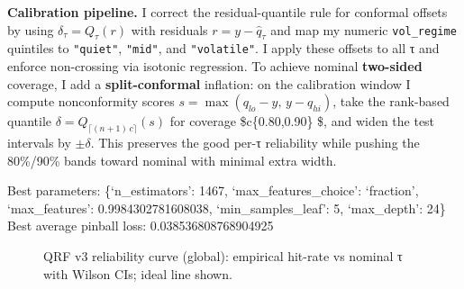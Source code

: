 \documentclass[
  a4paper,
  DIV=11,
  numbers=noendperiod]{scrreprt}
\begin{document}
\textbf{Calibration pipeline.} I correct the residual-quantile rule for
conformal offsets by using \(\delta_\tau = Q_\tau(r)\) with residuals
\(r = y - \hat q_\tau\) and map my numeric \texttt{vol\_regime}
quintiles to \texttt{"quiet"}, \texttt{"mid"}, and \texttt{"volatile"}.
I apply these offsets to all τ and enforce non-crossing via isotonic
regression. To achieve nominal \textbf{two-sided} coverage, I add a
\textbf{split-conformal} inflation: on the calibration window I compute
nonconformity scores \(s=\max(q_{lo}-y,\,y-q_{hi})\), take the
rank-based quantile \(\delta = Q_{\lceil (n+1)\,c \rceil}(s)\) for
coverage \$c\in\{0.80,0.90\} \$, and widen the test intervals by
\(\pm \delta\). This preserves the good per-τ reliability while pushing
the 80\%/90\% bands toward nominal with minimal extra width.

Best parameters: \{`n\_estimators': 1467, `max\_features\_choice':
`fraction', `max\_features': 0.9984302781608038, `min\_samples\_leaf':
5, `max\_depth': 24\} Best average pinball loss: 0.038536808768904925

\begin{figure}


\caption{\label{fig-qrf-v3-reliability-global}QRF v3 reliability curve
(global): empirical hit-rate vs nominal τ with Wilson CIs; ideal line
shown.}

\end{figure}%
\end{document}
